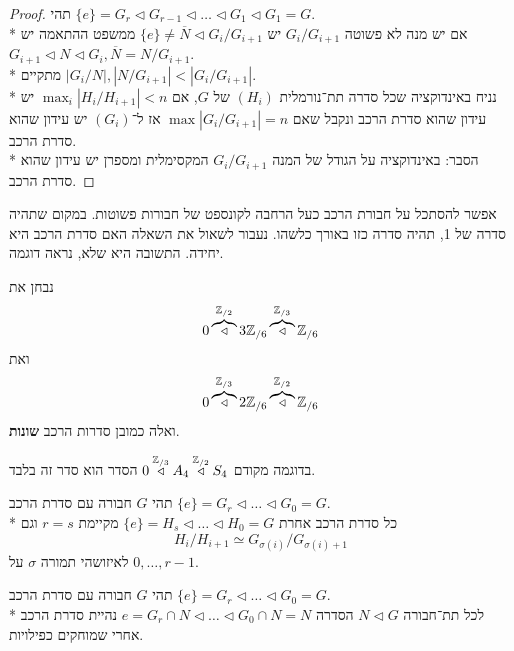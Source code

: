 \begin{proof}
	תהי $\{e \} = G_r \triangleleft G_{r - 1} \triangleleft \dots \triangleleft G_1 \triangleleft G_1 = G$. \\*
	אם יש מנה לא פשוטה $G_i / G_{i + 1}$ יש $\{e\} \ne \overline{N} \triangleleft G_i / G_{i + 1}$ ממשפט ההתאמה יש $G_{i + 1} \triangleleft N \triangleleft G_i, \overline{N} = N / G_{i + 1}$. \\*
	מתקיים $|G_i / N|, |N / G_{i + 1}| < |G_i / G_{i + 1}|$. \\*
	נניח באינדוקציה שכל סדרה תת־נורמלית $(H_i)$ של $G$, אם $\max_{i} |H_i / H_{i + 1}| < n$ יש עידון שהוא סדרת הרכב ונקבל שאם $\max |G_i / G_{i + 1}| = n$ אז ל־$(G_i)$ יש עידון שהוא סדרת הרכב. \\*
	הסבר: באינדוקציה על הגודל של המנה $G_i / G_{i + 1}$ המקסימלית ומספרן יש עידון שהוא סדרת הרכב.
\end{proof}
אפשר להסתכל על חבורת הרכב כעל הרחבה לקונספט של חבורות פשוטות. במקום שתהיה סדרה של 1, תהיה סדרה כזו באורך כלשהו.
נעבור לשאול את השאלה האם סדרת הרכב היא יחידה. התשובה היא שלא, נראה דוגמה.
\begin{example}
	נבחן את
	\[
		0 \overbrace{\triangleleft}^{\mathbb{Z}_{/2}} 3\mathbb{Z}_{/6} \overbrace{\triangleleft}^{\mathbb{Z}_{/3}} \mathbb{Z}_{/6}
	\]
	ואת
	\[
		0 \overbrace{\triangleleft}^{\mathbb{Z}_{/3}} 2\mathbb{Z}_{/6} \overbrace{\triangleleft}^{\mathbb{Z}_{/2}} \mathbb{Z}_{/6}
	\]
	ואלה כמובן סדרות הרכב \textbf{שונות}.
\end{example}
בדוגמה מקודם $0 \overset{\mathbb{Z}_{/3}}{\triangleleft} A_4 \overset{\mathbb{Z}_{/2}}{\triangleleft} S_4$ הסדר הוא סדר זה בלבד.
\begin{theorem}
	תהי $G$ חבורה עם סדרת הרכב $\{e\} = G_r \triangleleft \dots \triangleleft G_0 = G$. \\*
	כל סדרת הרכב אחרת $\{e\} = H_s \triangleleft \dots \triangleleft H_0 = G$ מקיימת $r = s$ וגם
	\[
		H_i / H_{i + 1} \simeq G_{\sigma(i)} / G_{\sigma(i) + 1}
	\]
	לאיזושהי תמורה $\sigma$ על ${0, \dots, r - 1}$.
\end{theorem}
\begin{lemma}
	תהי $G$ חבורה עם סדרת הרכב $\{e\} = G_r \triangleleft \dots \triangleleft G_0 = G$. \\*
	לכל תת־חבורה $N \triangleleft G$ הסדרה ${e} = G_r \cap N \triangleleft \dots \triangleleft G_0 \cap N = N$
	נהיית סדרת הרכב אחרי שמוחקים כפילויות.
\end{lemma}
